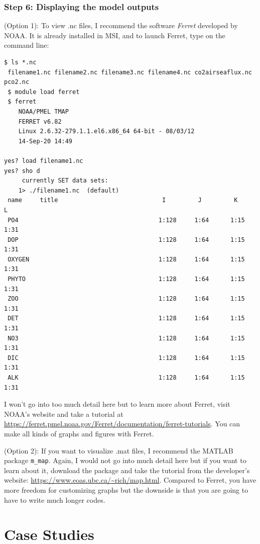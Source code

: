 \documentclass[a4paper]{article}
\def\noin{\noindent }
\begin{document}
\subsubsection{Step 6: Displaying the model outputs}
\noin (Option 1): To view .nc files, I recommend the software \emph{Ferret} developed by NOAA. It is already installed in MSI, and to launch Ferret, type on the command line:
\begin{lstlisting}[style=DOS]
 $ ls *.nc
 filename1.nc filename2.nc filename3.nc filename4.nc co2airseaflux.nc pco2.nc
 $ module load ferret
 $ ferret
 	NOAA/PMEL TMAP
 	FERRET v6.82
 	Linux 2.6.32-279.1.1.el6.x86_64 64-bit - 08/03/12
 	14-Sep-20 14:49

yes? load filename1.nc
yes? sho d
     currently SET data sets:
    1> ./filename1.nc  (default)
 name     title                             I         J         K         L
 PO4                                       1:128     1:64      1:15      1:31
 DOP                                       1:128     1:64      1:15      1:31
 OXYGEN                                    1:128     1:64      1:15      1:31
 PHYTO                                     1:128     1:64      1:15      1:31
 ZOO                                       1:128     1:64      1:15      1:31
 DET                                       1:128     1:64      1:15      1:31
 NO3                                       1:128     1:64      1:15      1:31
 DIC                                       1:128     1:64      1:15      1:31
 ALK                                       1:128     1:64      1:15      1:31
\end{lstlisting}
I won't go into too much detail here but to learn more about Ferret, visit NOAA's website and take a tutorial at \url{https://ferret.pmel.noaa.gov/Ferret/documentation/ferret-tutorials}. You can make all kinds of graphs and figures with Ferret.

\vspace{5mm}
\noin (Option 2): If you want to visualize .mat files, I recommend the MATLAB package \verb|m_map|. Again, I would not go into much detail here but if you want to learn about it, download the package and take the tutorial from the developer's website: \url{https://www.eoas.ubc.ca/~rich/map.html}. Compared to Ferret, you have more freedom for customizing graphs but the downside is that you are going to have to write much longer codes.

\section{Case Studies}
\end{document}
